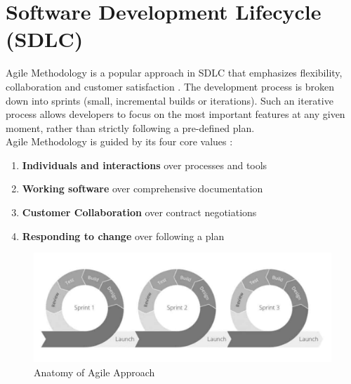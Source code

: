 \chapter{Software Development Lifecycle (SDLC)}
\label{app:agile}

Agile Methodology is a popular approach in SDLC that emphasizes flexibility, collaboration and customer satisfaction \cite{30} \cite{31}. The development process is broken down into sprints (small, incremental builds or iterations). Such an iterative process allows developers to focus on the most important features at any given moment, rather than strictly following a pre-defined plan. \\

Agile Methodology is guided by its four core values \cite{32}: 
\begin{enumerate}
    \item \textbf{Individuals and interactions} over processes and tools
    \item \textbf{Working software} over comprehensive documentation
    \item \textbf{Customer Collaboration} over contract negotiations
    \item \textbf{Responding to change} over following a plan 
\end{enumerate}


\begin{figure}
    \centering
    \includegraphics[width=1\linewidth]{images/sdlc.png}
    \caption{Anatomy of Agile Approach \cite{33}}
    \label{fig:sdlc}
\end{figure}



